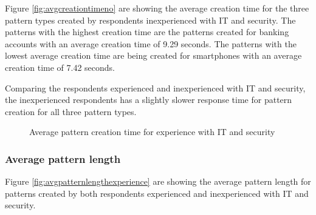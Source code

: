     Figure \ref{fig:avgcreationtimeno} are showing the average creation time for the three pattern types created by respondents inexperienced with IT and security. The patterns with the highest creation time are the patterns created for banking accounts with an average creation time of 9.29 seconds. The patterns with the lowest average creation time are being created for smartphones with an average creation time of 7.42 seconds.

    Comparing the respondents experienced and inexperienced with IT and security, the inexperienced respondents has a slightly slower response time for pattern creation for all three pattern types. 

      \begin{figure}[H]
        \centering
        \caption{Average pattern creation time for experience with IT and security}
        \label{fig:avgcreationtimeexperience}
      \end{figure}

    \subsubsection{Average pattern length}
    Figure \ref{fig:avgpatternlengthexperience} are showing the average pattern length for patterns created by both respondents experienced and inexperienced with IT and security.

